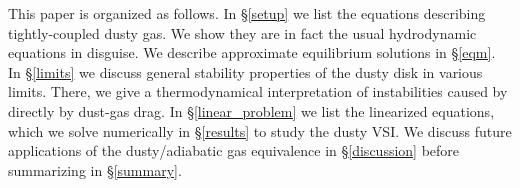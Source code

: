 \documentclass[iop, numberedappendix]{emulateapj}
\begin{document}
This paper is organized as follows. In \S\ref{setup} we list the
equations describing tightly-coupled dusty gas. We show they are in 
fact the usual hydrodynamic equations in disguise. 
We describe approximate  equilibrium solutions in \S\ref{eqm}. In \S\ref{limits} we discuss
general stability properties of the dusty disk in various
limits. There, we give a thermodynamical interpretation of
instabilities caused by directly by dust-gas drag. In
\S\ref{linear_problem} we list the linearized equations, which we
solve numerically in \S\ref{results} to study the dusty VSI. We 
discuss future applications of the dusty/adiabatic gas equivalence in 
\S\ref{discussion} before summarizing in \S\ref{summary}. 






\appendix




\end{document}
